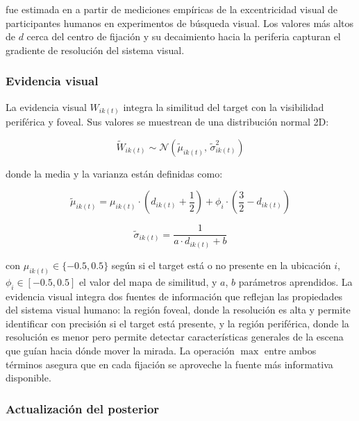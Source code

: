 \noindent fue estimada en \citet{bujia2022} a partir de
mediciones empíricas de la excentricidad visual de participantes
humanos en experimentos de búsqueda visual. 
Los valores más altos de $d$ cerca del centro de fijación y su 
decaimiento hacia la periferia capturan el gradiente de resolución 
del sistema visual.

\subsubsection{Evidencia visual}

La evidencia visual $W_{ik(t)}$ integra la similitud del target con 
la visibilidad periférica y foveal. Sus valores se muestrean de una 
distribución normal 2D:

\begin{equation}
    \widetilde{W}_{ik(t)} \sim \mathcal{N}\left(\widetilde{\mu}_{ik(t)},\, 
    \widetilde{\sigma}^2_{ik(t)}\right)
\end{equation}

\noindent donde la media y la varianza están definidas como:

\begin{equation}
    \widetilde{\mu}_{ik(t)} = \mu_{ik(t)} \cdot \left(d_{ik(t)} + 
    \frac{1}{2}\right) + \phi_i \cdot \left(\frac{3}{2} - d_{ik(t)}\right)
\end{equation}

\begin{equation}
    \widetilde{\sigma}_{ik(t)} = \frac{1}{a \cdot d_{ik(t)} + b}
\end{equation}

\noindent con $\mu_{ik(t)} \in \{-0.5, 0.5\}$ según si el target 
está o no presente en la ubicación $i$, $\phi_i \in [-0.5, 0.5]$ 
el valor del mapa de similitud, y $a$, $b$ parámetros aprendidos. 
La evidencia visual integra dos fuentes de información que reflejan 
las propiedades del sistema visual humano: la región foveal, donde 
la resolución es alta y permite identificar con precisión si el 
target está presente, y la región periférica, donde la resolución 
es menor pero permite detectar características generales de la escena 
que guían hacia dónde mover la mirada. La operación $\max$ entre 
ambos términos asegura que en cada fijación se aproveche la fuente 
más informativa disponible.

\subsubsection{Actualización del posterior}

